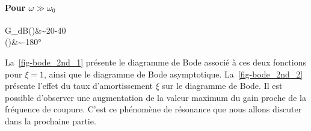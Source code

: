 \paragraph{Pour $\omega \gg\omega_0$}
\begin{bequation}
G_{dB}(\omega)&\sim20-40\log\omega\\
    \phi(\omega)&\sim-180\si{\degree}
\end{bequation}
La~\cref{fig-bode_2nd_1} présente le diagramme de Bode associé à ces deux fonctions pour $\xi=1$, ainsi que le
diagramme de Bode asymptotique. La~\cref{fig-bode_2nd_2} présente l'effet du taux d'amortissement $\xi$ sur le diagramme 
de Bode. Il est possible d'observer une augmentation de la valeur maximum du gain proche de la fréquence de coupure.
C'est ce phénomène de résonance que nous allons discuter dans la prochaine partie.


